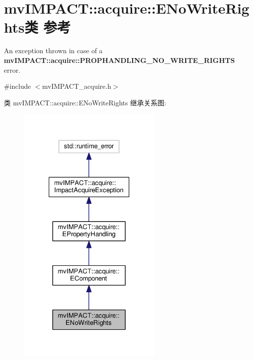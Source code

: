 \hypertarget{classmv_i_m_p_a_c_t_1_1acquire_1_1_e_no_write_rights}{\section{mv\+I\+M\+P\+A\+C\+T\+:\+:acquire\+:\+:E\+No\+Write\+Rights类 参考}
\label{classmv_i_m_p_a_c_t_1_1acquire_1_1_e_no_write_rights}
}


An exception thrown in case of a {\bfseries mv\+I\+M\+P\+A\+C\+T\+::acquire\+::\+P\+R\+O\+P\+H\+A\+N\+D\+L\+I\+N\+G\+\_\+\+N\+O\+\_\+\+W\+R\+I\+T\+E\+\_\+\+R\+I\+G\+H\+T\+S} error.  




{\ttfamily \#include $<$mv\+I\+M\+P\+A\+C\+T\+\_\+acquire.\+h$>$}



类 mv\+I\+M\+P\+A\+C\+T\+:\+:acquire\+:\+:E\+No\+Write\+Rights 继承关系图\+:
\nopagebreak
\begin{figure}[H]
\begin{center}
\leavevmode
\includegraphics[width=202pt]{classmv_i_m_p_a_c_t_1_1acquire_1_1_e_no_write_rights__inherit__graph}
\end{center}
\end{figure}



